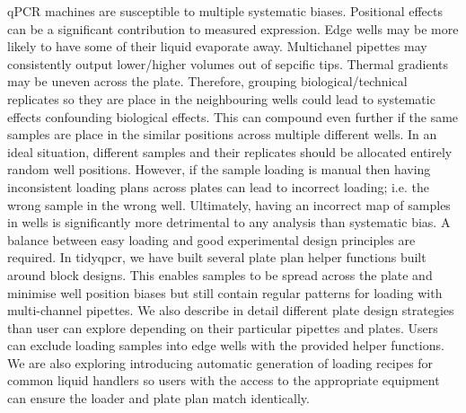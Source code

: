 \documentclass{SBCbookchapter}
\begin{document}
qPCR machines are susceptible to multiple systematic biases. Positional effects can be a significant contribution to measured expression. Edge wells may be more likely to have some of their liquid evaporate away. Multichanel pipettes may consistently output lower/higher volumes out of sepcific tips. Thermal gradients may be uneven across the plate. Therefore, grouping biological/technical replicates so they are place in the neighbouring wells could lead to systematic effects confounding biological effects. This can compound even further if the same samples are place in the similar positions across multiple different wells. In an ideal situation, different samples and their replicates should be allocated entirely random well positions. However, if the sample loading is manual then having inconsistent loading plans across plates can lead to incorrect loading; i.e. the wrong sample in the wrong well. Ultimately, having an incorrect map of samples in wells is significantly more detrimental to any analysis than systematic bias. A balance between easy loading and good experimental design principles are required. In tidyqpcr, we have built several plate plan helper functions built around block designs. This enables samples to be spread across the plate and minimise well position biases but still contain regular patterns for loading with multi-channel pipettes. We also describe in detail different plate design strategies than user can explore depending on their particular pipettes and plates. Users can exclude loading samples into edge wells with the provided helper functions. We are also exploring introducing automatic generation of loading recipes for common liquid handlers so users with the access to the appropriate equipment can ensure the loader and plate plan match identically.
\end{document}
